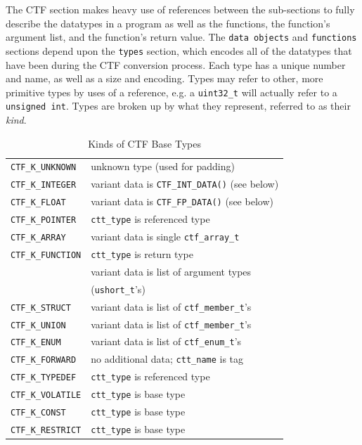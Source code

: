 The CTF section makes heavy use of references between the sub-sections
to fully describe the datatypes in a program as well as the functions,
the function's argument list, and the function's return value.  The
\verb|data objects| and \verb|functions| sections depend upon the
\verb|types| section, which encodes all of the datatypes that have
been during the CTF conversion process.  Each type has a unique number
and name, as well as a size and encoding.  Types may refer to other,
more primitive types by uses of a reference, e.g. a \verb|uint32_t|
will actually refer to a \verb|unsigned int|.  Types are broken up by
what they represent, referred to as their \emph{kind}.

\begin{table}
  \centering
  \begin{tabular}{|l|l|}
    \hline
    \verb|CTF_K_UNKNOWN|    & unknown type (used for padding) \\
    \verb|CTF_K_INTEGER|    & variant data is \verb|CTF_INT_DATA()| (see below)\\
    \verb|CTF_K_FLOAT|      & variant data is \verb|CTF_FP_DATA()| (see below)\\
    \verb|CTF_K_POINTER|    & \verb|ctt_type| is referenced type\\
    \verb|CTF_K_ARRAY|      & variant data is single \verb|ctf_array_t|\\
    \verb|CTF_K_FUNCTION| & \verb|ctt_type| is return type\\
                            &  variant data is list of argument types\\
                            & (\verb|ushort_t|'s)\\
    \verb|CTF_K_STRUCT|     & variant data is list of \verb|ctf_member_t|'s\\
    \verb|CTF_K_UNION|      & variant data is list of \verb|ctf_member_t|'s\\
    \verb|CTF_K_ENUM|       & variant data is list of \verb|ctf_enum_t|'s\\
    \verb|CTF_K_FORWARD|    & no additional data; \verb|ctt_name| is tag\\
    \verb|CTF_K_TYPEDEF|    & \verb|ctt_type| is referenced type\\
    \verb|CTF_K_VOLATILE|   & \verb|ctt_type| is base type\\
    \verb|CTF_K_CONST|      & \verb|ctt_type| is base type\\
    \verb|CTF_K_RESTRICT|   & \verb|ctt_type| is base type\\
    \hline
  \end{tabular}
  \caption{Kinds of CTF Base Types}
  \label{tbl:ctf-kinds}
\end{table}

